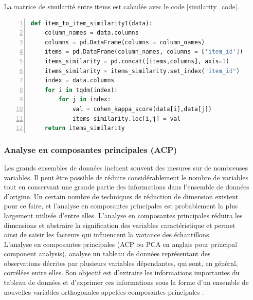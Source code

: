 La matrice de similarité entre items est calculée avec le code \ref{similarity_code}.
\begin{lstlisting}[language=Python,label={similarity_code}, basicstyle=\scriptsize, frame=l,framesep=4.5mm,framexleftmargin=2.5mm,tabsize=2,numbers=left,fillcolor=\color{blueforest!70},rulecolor=\color{blueforest},numberstyle=\normalfont\tiny\color{white}]
	def item_to_item_similarity1(data):
    column_names = data.columns
    columns = pd.DataFrame(columns = column_names)
    items = pd.DataFrame(column_names, columns = ['item_id'])
    items_similarity = pd.concat([items,columns], axis=1)
    items_similarity = items_similarity.set_index("item_id")
    index = data.columns
    for i in tqdm(index):
        for j in index:
            val = cohen_kappa_score(data[i],data[j])
            items_similarity.loc[i,j] = val
    return items_similarity
\end{lstlisting}

\subsubsection{Analyse en composantes principales (ACP)}
Les grands ensembles de données incluent souvent des mesures sur de nombreuses variables. Il peut être possible de réduire considérablement le nombre de variables tout en conservant une grande partie des informations dans l'ensemble de données d'origine. Un certain nombre de techniques de réduction de dimension existent pour ce faire, et l'analyse en composantes principales est probablement la plus largement utilisée d'entre elles. L'analyse en composantes principales réduira les dimensions et abstraire la signification des variables caractéristique et permet ainsi de saisir les facteurs qui influencent la variance des échantillons. \\
L'analyse en composantes principales (ACP ou PCA en anglais pour principal component analysis), analyse un tableau de données représentant des observations décrites par plusieurs variables dépendantes, qui sont, en général, corrélées entre elles. Son objectif est d'extraire les informations importantes du tableau de données et d'exprimer ces informations sous la forme d'un ensemble de nouvelles variables orthogonales appelées composantes principales \cite{abdi2010principal}.

